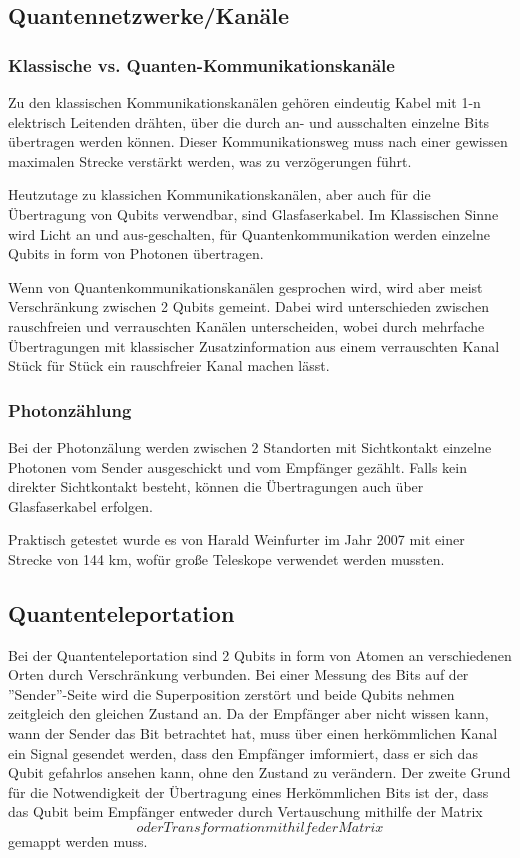 \subsection{Quantennetzwerke/Kanäle}
\label{sec:Quantennetzwerke/Kanale}

\subsubsection{Klassische vs. Quanten-Kommunikationskanäle}
\label{sec:klassich_vs_quanten}

Zu den klassischen Kommunikationskanälen gehören eindeutig Kabel mit 1-n elektrisch Leitenden drähten, über die durch an- und ausschalten einzelne Bits übertragen werden können. Dieser Kommunikationsweg muss nach einer gewissen maximalen Strecke verstärkt werden, was zu verzögerungen führt.

Heutzutage zu klassichen Kommunikationskanälen, aber auch für die Übertragung von Qubits verwendbar, sind Glasfaserkabel. Im Klassischen Sinne wird Licht an und aus-geschalten, für Quantenkommunikation werden einzelne Qubits in form von Photonen übertragen.

Wenn von Quantenkommunikationskanälen gesprochen wird, wird aber meist Verschränkung zwischen 2 Qubits gemeint. Dabei wird unterschieden zwischen rauschfreien und verrauschten Kanälen unterscheiden, wobei durch mehrfache Übertragungen mit klassischer Zusatzinformation aus einem verrauschten Kanal Stück für Stück ein rauschfreier Kanal machen lässt.

\subsubsection{Photonzählung}
\label{sec:photonzaelung}

Bei der Photonzälung werden zwischen 2 Standorten mit Sichtkontakt einzelne Photonen vom Sender ausgeschickt und vom Empfänger gezählt. Falls kein direkter Sichtkontakt besteht, können die Übertragungen auch über Glasfaserkabel erfolgen.

Praktisch getestet wurde es von Harald Weinfurter im Jahr 2007 mit einer Strecke von 144 km, wofür große Teleskope verwendet werden mussten.

\subsection{Quantenteleportation}
\label{sec:quantenteleportation}

Bei der Quantenteleportation sind 2 Qubits in form von Atomen an verschiedenen Orten durch Verschränkung verbunden. Bei einer Messung des Bits auf der ''Sender''-Seite wird die Superposition zerstört und beide Qubits nehmen zeitgleich den gleichen Zustand an. Da der Empfänger aber nicht wissen kann, wann der Sender das Bit betrachtet hat, muss über einen herkömmlichen Kanal ein Signal gesendet werden, dass den Empfänger imformiert, dass er sich das Qubit gefahrlos ansehen kann, ohne den Zustand zu verändern. Der zweite Grund für die Notwendigkeit der Übertragung eines Herkömmlichen Bits ist der, dass das Qubit beim Empfänger entweder durch Vertauschung mithilfe der Matrix $$ oder Transformation mithilfe der Matrix $$ gemappt werden muss.

